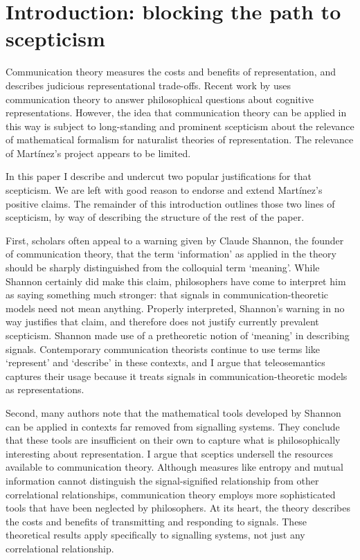 \section{Introduction: blocking the path to scepticism}\label{sec:intro}

Communication theory measures the costs and benefits of representation, and describes judicious representational trade-offs. 
Recent work by \citet{martinez2019representations} uses communication theory to answer philosophical questions about cognitive representations.
However, the idea that communication theory can be applied in this way is subject to long-standing and prominent scepticism about the relevance of mathematical formalism for naturalist theories of representation.
The relevance of Mart\'{i}nez's project appears to be limited.

In this paper I describe and undercut two popular justifications for that scepticism.
We are left with good reason to endorse and extend Mart\'{i}nez's positive claims.
The remainder of this introduction outlines those two lines of scepticism, by way of describing the structure of the rest of the paper.

First, scholars often appeal to a warning given by Claude Shannon, the founder of communication theory, that the term `information' as applied in the theory should be sharply distinguished from the colloquial term `meaning'.
While Shannon certainly did make this claim, philosophers have come to interpret him as saying something much stronger: that signals in communication-theoretic models need not mean anything.
Properly interpreted, Shannon's warning in no way justifies that claim, and therefore does not justify currently prevalent scepticism.
Shannon made use of a pretheoretic notion of `meaning' in describing signals.
Contemporary communication theorists continue to use terms like `represent' and `describe' in these contexts, and I argue that teleosemantics captures their usage because it treats signals in communication-theoretic models as representations.

Second, many authors note that the mathematical tools developed by Shannon can be applied in contexts far removed from signalling systems.
They conclude that these tools are insufficient on their own to capture what is philosophically interesting about representation.
I argue that sceptics undersell the resources available to communication theory.
Although measures like entropy and mutual information cannot distinguish the signal-signified relationship from other correlational relationships, communication theory employs more sophisticated tools that have been neglected by philosophers.
At its heart, the theory describes the costs and benefits of transmitting and responding to signals.
These theoretical results apply specifically to signalling systems, not just any correlational relationship.

